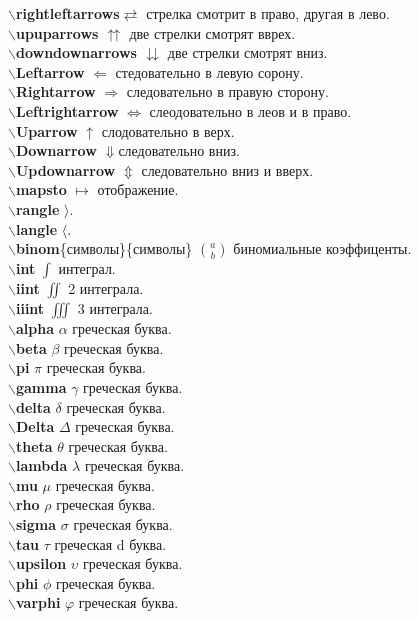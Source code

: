 \documentclass{article}
\newcommand{\bs}{$\backslash$}
\newcommand{\bd}[1]{{\bfseries #1}} %
\newcommand{\bb}[1]{\bd{\bs #1}} %
\begin{document}
\bb{rightleftarrows}$\rightleftarrows$ стрелка смотрит в право, другая в лево.\\
\bb{upuparrows} $\upuparrows$ две стрелки смотрят вврех.\\
\bb{downdownarrows} $\downdownarrows$ две стрелки смотрят вниз.\\
\bb{Leftarrow} $\Leftarrow$ стедовательно в левую сорону.\\
\bb{Rightarrow} $\Rightarrow$ следовательно в правую сторону.\\
\bb{Leftrightarrow} $\Leftrightarrow$ слеодовательно в леов и в право.\\
\bb{Uparrow} $\uparrow$ слодовательно в верх.\\
\bb{Downarrow} $\Downarrow$следовательно вниз.\\
\bb{Updownarrow} $\Updownarrow$ следовательно вниз и вверх.\\
\bb{mapsto} $\mapsto$ отображение.\\
\bb{rangle} $\rangle$.\\
\bb{langle} $\langle$.\\
\bb{binom}\{символы\}\{символы\} $\binom{a}{b}$ биномиальные коэффиценты.\\
\bb{int} $\int$ интеграл.\\
\bb{iint} $\iint$ 2 интеграла.\\
\bb{iiint} $\iiint$ 3 интеграла.\\
\bb{alpha} $\alpha$ греческая буква.\\
\bb{beta} $\beta$ греческая буква.\\
\bb{pi} $\pi$ греческая буква.\\
\bb{gamma} $\gamma$ греческая буква.\\
\bb{delta} $\delta$ греческая буква.\\
\bb{Delta} $\Delta$ греческая буква.\\
\bb{theta} $\theta$ греческая буква.\\
\bb{lambda} $\lambda$ греческая буква.\\
\bb{mu} $\mu$ греческая буква.\\
\bb{rho} $\rho$ греческая буква.\\
\bb{sigma} $\sigma$ греческая буква.\\
\bb{tau} $\tau$ греческая d
буква.\\
\bb{upsilon} $\upsilon$ греческая буква.\\
\bb{phi} $\phi$ греческая буква.\\
\bb{varphi} $\varphi$ греческая буква.\\
\end{document}
